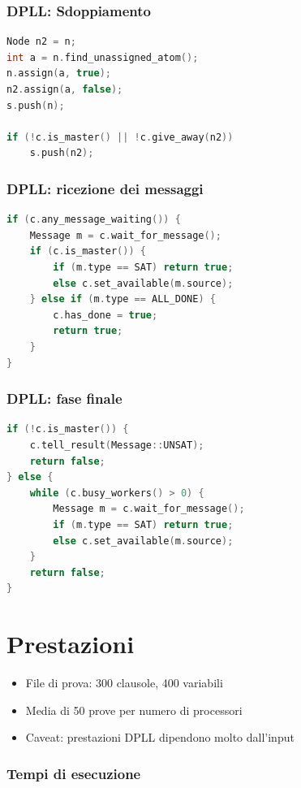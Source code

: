 \documentclass[12pt,xcolor=dvipsnames]{beamer}
\begin{document}
\begin{frame}[fragile]
    \frametitle{DPLL: Sdoppiamento}
\begin{lstlisting}[language=c++]
Node n2 = n;
int a = n.find_unassigned_atom();
n.assign(a, true);
n2.assign(a, false);
s.push(n);

if (!c.is_master() || !c.give_away(n2))
    s.push(n2);
\end{lstlisting}
\end{frame}

\begin{frame}[fragile]
    \frametitle{DPLL: ricezione dei messaggi}
\begin{lstlisting}[language=c++]
if (c.any_message_waiting()) {
    Message m = c.wait_for_message();
    if (c.is_master()) {
        if (m.type == SAT) return true;
        else c.set_available(m.source);
    } else if (m.type == ALL_DONE) {
        c.has_done = true;
        return true;
    }
}
\end{lstlisting}
\end{frame}

\begin{frame}[fragile]
    \frametitle{DPLL: fase finale}
\begin{lstlisting}[language=c++]
if (!c.is_master()) {
    c.tell_result(Message::UNSAT);
    return false;
} else {
    while (c.busy_workers() > 0) {
        Message m = c.wait_for_message();
        if (m.type == SAT) return true;
        else c.set_available(m.source);
    }
    return false;
}
\end{lstlisting}
\end{frame}

\section{Prestazioni}

\begin{frame}
    \begin{itemize}
     \item File di prova: 300 clausole, 400 variabili \pause
     \item Media di 50 prove per numero di processori \pause
     \item Caveat: prestazioni DPLL dipendono molto dall'input
    \end{itemize}
\end{frame}

\begin{frame}
	\frametitle{Tempi di esecuzione}
    \begin{center}
    \end{center}
\end{frame}
\end{document}
